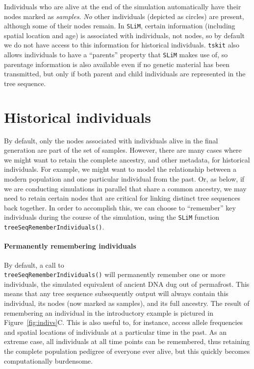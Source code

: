 \documentclass[12pt]{article}
\newcommand{\tskit}[0]{\texttt{tskit}\xspace}
\newcommand{\slim}[0]{\texttt{SLiM}\xspace}
\begin{document}
Individuals who are alive at the end of the simulation automatically have their nodes marked as \textit{samples}.
\emph{No} other individuals (depicted as circles) are present,
although some of their nodes remain.
In \slim, certain information (including spatial location and age) is associated with individuals,
not nodes, so by default we do not have access to this information for historical individuals.
\tskit also allows individuals to have a ``parents'' property that \slim makes use of,
so parentage information is also available even if no genetic material has been transmitted,
but only if both parent and child individuals are represented in the tree sequence.

\section{Historical individuals}
By default, only the nodes associated with individuals alive in the final generation are part of the set of samples.
However, there are many cases where we might want to retain the complete ancestry, and other metadata, for
historical individuals.
For example, we might want to model the relationship between a modern population and
one particular individual from the past.
Or, as below, if we are conducting simulations in parallel that share 
a common ancestry, we may need to retain certain nodes that are critical for linking distinct
tree sequences back together.
In order to accomplish this, we can choose to ``remember'' key individuals during the course of the simulation,
using the \slim function \verb|treeSeqRememberIndividuals()|.

\paragraph{Permanently remembering individuals}
By default, a call to \\ 
\verb|treeSeqRememberIndividuals()| will permanently remember one or more individuals,
the simulated equivalent of ancient DNA dug out of permafrost.
This means that any tree sequence subsequently output will always contain this individual,
its nodes (now marked as samples), and its full ancestry.
The result of remembering an individual in the introductory example is pictured
in Figure~\ref{fig:indivs}C.
This is also useful to, for instance, access allele frequencies and spatial locations of individuals
at a particular time in the past.
As an extreme case, all individuals at all time points can be remembered,
thus retaining the complete population pedigree of everyone ever alive,
but this quickly becomes computationally burdensome.
\end{document}
